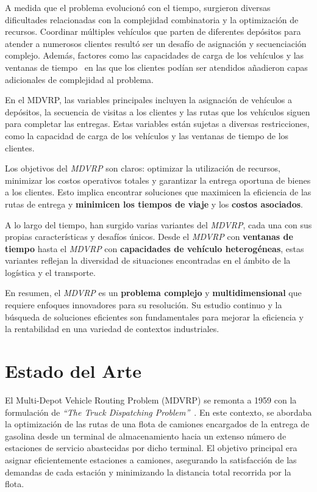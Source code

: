 \documentclass[letter, 10pt]{article}
\begin{document}
A medida que el problema evolucionó con el tiempo, surgieron diversas dificultades relacionadas con la complejidad combinatoria y la optimización de recursos. Coordinar múltiples vehículos que parten de diferentes depósitos para atender a numerosos clientes resultó ser un desafío de asignación y secuenciación complejo. Además, factores como las capacidades de carga de los vehículos y las ventanas de tiempo~\cite{MDVRPTW} en las que los clientes podían ser atendidos añadieron capas adicionales de complejidad al problema.

En el MDVRP, las variables principales incluyen la asignación de vehículos a depósitos, la secuencia de visitas a los clientes y las rutas que los vehículos siguen para completar las entregas. Estas variables están sujetas a diversas restricciones, como la capacidad de carga de los vehículos y las ventanas de tiempo de los clientes.

Los objetivos del \textit{MDVRP} son claros: optimizar la utilización de recursos, minimizar los costos operativos totales y garantizar la entrega oportuna de bienes a los clientes. Esto implica encontrar soluciones que maximicen la eficiencia de las rutas de entrega y \textbf{minimicen los tiempos de viaje} y los \textbf{costos asociados}.

A lo largo del tiempo, han surgido varias variantes del \textit{MDVRP}, cada una con sus propias características y desafíos únicos. Desde el \textit{MDVRP} con \textbf{ventanas de tiempo} hasta el \textit{MDVRP} con \textbf{capacidades de vehículo heterogéneas}, estas variantes reflejan la diversidad de situaciones encontradas en el ámbito de la logística y el transporte.

En resumen, el \textit{MDVRP} es un \textbf{problema complejo} y \textbf{multidimensional} que requiere enfoques innovadores para su resolución. Su estudio continuo y la búsqueda de soluciones eficientes son fundamentales para mejorar la eficiencia y la rentabilidad en una variedad de contextos industriales.

\section{Estado del Arte}

El Multi-Depot Vehicle Routing Problem (MDVRP) se remonta a 1959 con la formulación de \textit{``The Truck Dispatching Problem''}~\cite{TruckDispatchingProblem}. En este contexto, se abordaba la optimización de las rutas de una flota de camiones encargados de la entrega de gasolina desde un terminal de almacenamiento hacia un extenso número de estaciones de servicio abastecidas por dicho terminal. El objetivo principal era asignar eficientemente estaciones a camiones, asegurando la satisfacción de las demandas de cada estación y minimizando la distancia total recorrida por la flota.
\end{document}
